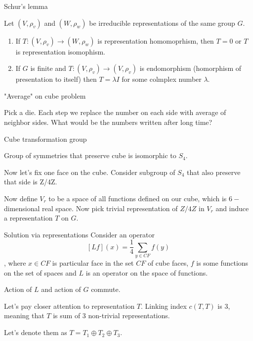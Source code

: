 \documentclass{beamer}
\begin{document}
\begin{frame}{Schur's lemma}
    \begin{lemma}
        Let $(V, \rho_v)$ and $(W, \rho_w)$ be irreducible representations of the same group $G$.
        \begin{enumerate}
            \item If $T: (V, \rho_v) \to (W, \rho_w)$ is representation homomoprhism, then $T=0$ or $T$ is representation isomophism.
            \item If $G$ is finite and $T : (V, \rho_v) \to (V, \rho_v) $ is endomorphism (homorphism of presentation to itself) then $T = \lambda I$ for some colmplex number $\lambda$.
        \end{enumerate}
    \end{lemma}

\end{frame}


\begin{frame}{"Average" on cube problem}
\begin{example}
    Pick a die. Each step we replace the number on each side with average of neighbor sides.
What would be the numbers written after long time?
\end{example}
\end{frame}







\begin{frame}{Cube transformation group}
    \begin{lemma}
        Group of symmetries that preserve cube is isomorphic to $S_4$.
    \end{lemma}
    Now let's fix one face on the cube. Consider subgroup of $S_4$ that also preserve that side is Z/4Z.

    Now define $V_r$ to be a space of all functions defined on our cube, which is $6-$ dimensional real space. Now pick trivial representation of $Z/4Z$ in $V_r$ and induce a representation $T$ on $G$.
\end{frame}

\begin{frame}{Solution via representations}
    Consider an operator $$[Lf] (x) = \frac{1}{4}\sum_{y\in CF} f(y)$$,
    where $x \in CF$ is particular face in the set $CF$ of cube faces, $f$ is some functions on the set of spaces and $L$ is an operator on the space of functions.
    
    \begin{lemma}
        Action of $L$ and action of $G$ commute.
    \end{lemma}

    Let's pay closer attention to representation $T$. Linking index $c(T,T)$ is $3$, meaning that $T$ is sum of $3$ non-trivial representations.    

    Let's denote them as  $T = T_1 \oplus T_2 \oplus T_3$.

\end{frame}
\end{document}
